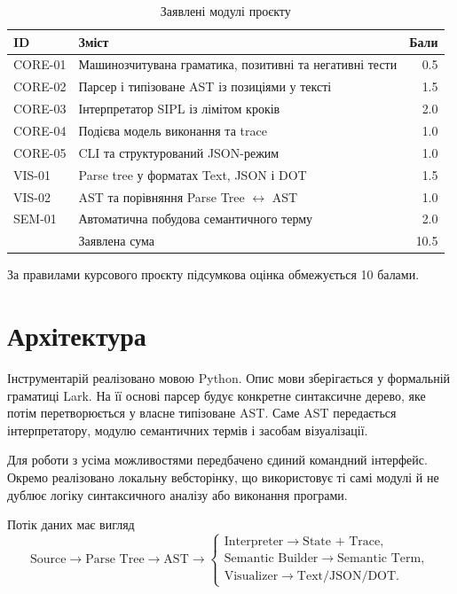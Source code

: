 \documentclass[12pt,a4paper]{article}
\begin{document}
\begin{table}[h]
\centering
\caption{Заявлені модулі проєкту}
\label{tab:tasks}
\begin{tabular}{>{\raggedright\arraybackslash}p{18mm}p{100mm}r}
\toprule
ID & Зміст & Бали\\
\midrule
CORE-01 & Машинозчитувана граматика, позитивні та негативні тести & 0.5\\
CORE-02 & Парсер і типізоване AST із позиціями у тексті & 1.5\\
CORE-03 & Інтерпретатор SIPL із лімітом кроків & 2.0\\
CORE-04 & Подієва модель виконання та trace & 1.0\\
CORE-05 & CLI та структурований JSON-режим & 1.0\\
VIS-01 & Parse tree у форматах Text, JSON і DOT & 1.5\\
VIS-02 & AST та порівняння Parse Tree $\leftrightarrow$ AST & 1.0\\
SEM-01 & Автоматична побудова семантичного терму & 2.0\\
\midrule
 & Заявлена сума & 10.5\\
\bottomrule
\end{tabular}
\end{table}

За правилами курсового проєкту підсумкова оцінка обмежується 10 балами.

\section{Архітектура}

Інструментарій реалізовано мовою Python. Опис мови зберігається у формальній
граматиці Lark. На її основі парсер будує конкретне синтаксичне дерево, яке
потім перетворюється у власне типізоване AST. Саме AST передається
інтерпретатору, модулю семантичних термів і засобам візуалізації.

Для роботи з усіма можливостями передбачено єдиний командний інтерфейс.
Окремо реалізовано локальну вебсторінку, що використовує ті самі модулі й не
дублює логіку синтаксичного аналізу або виконання програми.

Потік даних має вигляд
\[
\text{Source}
\longrightarrow \text{Parse Tree}
\longrightarrow \text{AST}
\longrightarrow
\begin{cases}
\text{Interpreter}\longrightarrow\text{State + Trace},\\
\text{Semantic Builder}\longrightarrow\text{Semantic Term},\\
\text{Visualizer}\longrightarrow\text{Text/JSON/DOT}.
\end{cases}
\]
\end{document}
